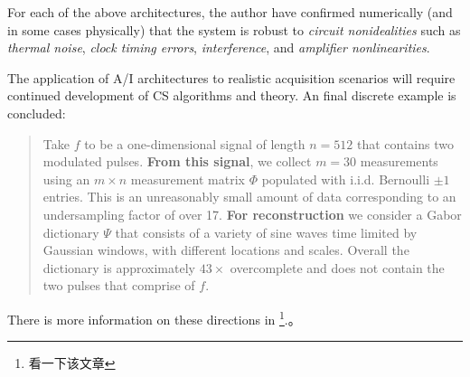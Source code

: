 For each of the above architectures, the author have confirmed numerically (and in some cases physically) that the system is robust to \emph{circuit nonidealities} such as  \emph{thermal noise}, \emph{clock timing errors}, \emph{interference}, and \emph{amplifier nonlinearities}.

The application of A/I architectures to realistic acquisition scenarios will require continued development of CS algorithms and theory. An final discrete example is concluded:
\begin{quote}
	Take $f$ to be a one-dimensional signal of length $n=512$ that contains two modulated pulses. \textbf{From this signal}, we collect $m=30$ measurements using an $m \times n$ measurement matrix $\Phi$ populated with i.i.d. Bernoulli $\pm1$ entries. This is an unreasonably small amount of data corresponding to an undersampling factor of over 17. \textbf{For reconstruction} we consider a \textcolor[rgb]{1,0,0}{Gabor dictionary $\Psi$} that consists of a variety of sine waves time limited by Gaussian windows, with different locations and scales. Overall the dictionary is approximately $43\times$ overcomplete and does not contain the two pulses that comprise of $f$. 
\end{quote}

There is more information on these directions in \cite{30}\footnote{看一下该文章\cite{30}}.。
